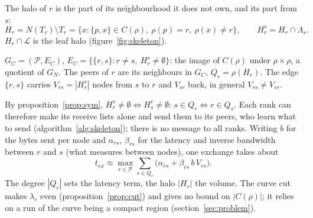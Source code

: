 \begin{definition}[halo]
  \label{def:halo}
  The halo of $r$ is the part of its neighbourhood it does not own, and
  its part from $s$:
  \[
    H_r = N(T_r) \setminus T_r = \{x : \{p, x\} \in C(\rho),\ \rho(p) = r,
      \ \rho(x) \ne r\}, \qquad
    H_r^s = H_r \cap \Lambda_s .
  \]
  $H_r \cap \mathcal{L}$ is the leaf halo (figure~\ref{fig:skeleton}).
\end{definition}

\begin{definition}
  \label{def:comm}
  $G_C = (\mathcal{P}, E_C)$, $E_C = \{\{r, s\} : r \ne s,\ H_r^s \ne
  \emptyset\}$: the image of $C(\rho)$ under $\rho \times \rho$, a quotient
  of $G_N$. The peers of $r$ are its neighbours in $G_C$, $Q_r = \rho(H_r)$.
  The edge $\{r, s\}$ carries $V_{rs} = |H_r^s|$ nodes from $s$ to $r$ and
  $V_{sr}$ back, in general $V_{rs} \ne V_{sr}$.
\end{definition}

By proposition~\ref{prop:sym}, $H_r^s \ne \emptyset \iff H_s^r \ne
\emptyset$: $s \in Q_r \iff r \in Q_s$. Each rank can therefore make its
receive lists alone and send them to its peers, who learn what to send
(algorithm~\ref{alg:skeleton}); there is no message to all ranks. Writing
$b$ for the bytes sent per node and $\alpha_{rs}$, $\beta_{rs}$ for the
latency and inverse bandwidth between $r$ and $s$ (what
 measures between nodes), one exchange takes about
\[
  t_{ex} \approx \max_{r \in \mathcal{P}} \sum_{s \in Q_r} \big(\alpha_{rs}
    + \beta_{rs}\, b\, V_{rs}\big).
\]
The degree $|Q_r|$ sets the latency term, the halo $|H_r|$ the volume.
The curve cut makes $\lambda_r$ even (proposition~\ref{prop:cut}) and
gives no bound on $|C(\rho)|$; it relies on a run of the curve being a
compact region (section~\ref{sec:problem}).

